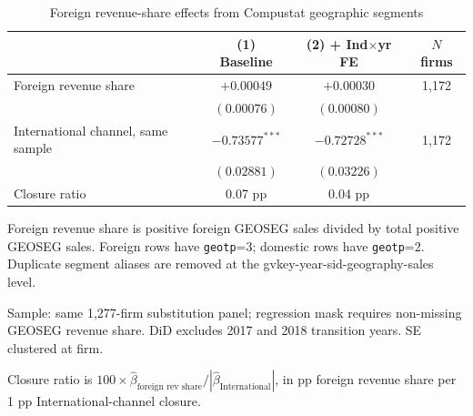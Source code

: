 \begin{table}[htbp]
\centering
\caption{Foreign revenue-share effects from Compustat geographic segments}
\label{tab:geo_revenue_share}
\small
\begin{tabular}{lccc}
\toprule
 & (1) Baseline & (2) + Ind$\times$yr FE & $N$ firms \\
\midrule
Foreign revenue share & $+0.00049$ & $+0.00030$ & 1,172 \\
 & $(0.00076)$ & $(0.00080)$ & \\
International channel, same sample & $-0.73577^{***}$ & $-0.72728^{***}$ & 1,172 \\
 & $(0.02881)$ & $(0.03226)$ & \\
\midrule
Closure ratio & 0.07 pp & 0.04 pp & \\
\bottomrule
\end{tabular}
\begin{tablenotes}\footnotesize
\item Foreign revenue share is positive foreign GEOSEG sales divided by total positive GEOSEG sales. Foreign rows have \texttt{geotp}=3; domestic rows have \texttt{geotp}=2. Duplicate segment aliases are removed at the gvkey-year-sid-geography-sales level.
\item Sample: same 1,277-firm substitution panel; regression mask requires non-missing GEOSEG revenue share. DiD excludes 2017 and 2018 transition years. SE clustered at firm.
\item Closure ratio is $100\times\hat\beta_{\text{foreign rev share}}/|\hat\beta_{\text{International}}|$, in pp foreign revenue share per 1 pp International-channel closure.
\end{tablenotes}
\end{table}
